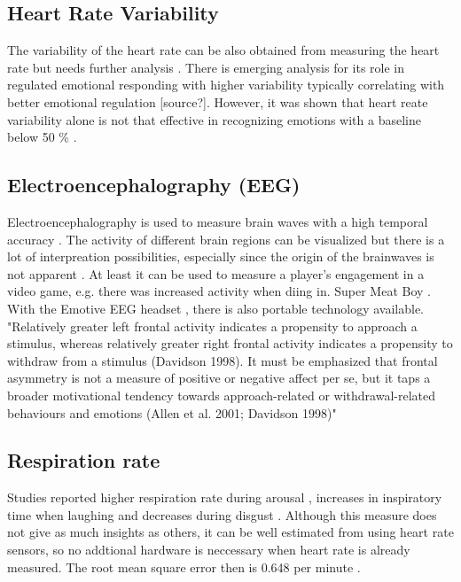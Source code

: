 \subsection{Heart Rate Variability}
The variability of the heart rate can be also obtained from measuring the heart rate but needs further analysis \cite{nacke2015physiological}. There is emerging analysis for its role in regulated emotional responding \cite{appelhans2006heat} with higher variability typically correlating with better emotional regulation [source?]. However, it was shown that heart reate variability alone is not that effective in recognizing emotions with a baseline below 50 \% \cite{ferdinando2014emotion}.

\subsection{Electroencephalography (EEG)}
Electroencephalography is used to measure brain waves with a high temporal accuracy \cite{nacke2015physiological}. The activity of different brain regions can be visualized but there is a lot of interpreation possibilities, especially since the origin of the brainwaves is not apparent \cite{nacke2015physiological}. At least it can be used to measure a player's engagement in a video game, e.g. there was increased activity when diing in. Super Meat Boy \cite{mcmahan2018evaluating}. With the Emotive EEG headset \cite{link_emotiv}, there is also portable technology available.
"Relatively greater left frontal activity indicates a propensity to approach a stimulus, whereas relatively greater right frontal activity indicates a propensity to withdraw from a stimulus (Davidson 1998). It must be emphasized that
frontal asymmetry is not a measure of positive or negative affect per se, but
it taps a broader motivational tendency towards approach-related or withdrawal-related behaviours and emotions (Allen et al. 2001; Davidson 1998)" \cite{kivikangas2011review}

\subsection{Respiration rate}
Studies reported higher respiration rate during arousal \cite{homma2008breathing}, increases in inspiratory time when laughing and decreases during disgust \cite{boiten1998the}. Although this measure does not give as much insights as others, it can be well estimated from using heart rate sensors, so no addtional hardware is neccessary when heart rate is already measured. The root mean square error then is 0.648 per minute \cite{natarajan2021measurement}.

